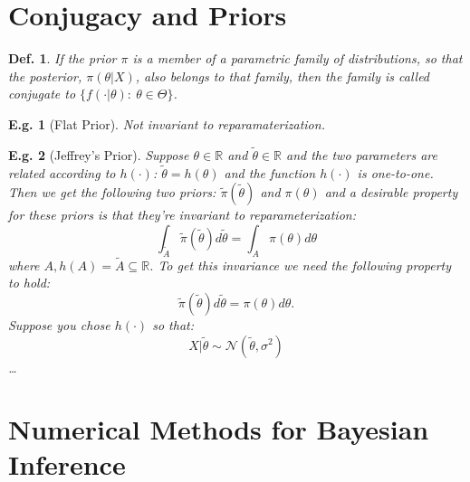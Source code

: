 \documentclass{tufte-book}
\theoremstyle{mytheoremstyle}
\theoremstyle{mylemstyle}
\theoremstyle{mydefstyle}
\newtheorem*{mydef}{Def.}
\newtheorem*{ex}{E.g.}
\begin{document}
\section{Conjugacy and Priors}
\begin{mydef} If the prior \(\pi\) is a member of a parametric family of distributions, so that the posterior, \(\pi(\theta|X)\), also belongs to that family, then the family is called conjugate to \(\{f(\cdot | \theta):\ \theta \in \Theta\}\). 
\end{mydef}

\begin{ex}[Flat Prior] Not invariant to reparamaterization. 
\end{ex}


\begin{ex}[Jeffrey's Prior] Suppose \(\theta \in \mathbb{R}\) and \(\tilde{\theta} \in \mathbb{R}\) and the two parameters are related according to \(h(\cdot)\): \(\tilde{\theta} = h(\theta)\) and the function \(h(\cdot)\) is one-to-one. Then we get the following two priors: \(\tilde{\pi}(\tilde{\theta})\) and \(\pi(\theta)\) and a desirable property for these priors is that they're invariant to reparameterization:
	\[\int_{\tilde{A}} \tilde{\pi}(\tilde{\theta})d\tilde{\theta} = \int_A \pi(\theta)d\theta\]
where \(A, h(A)=\tilde{A} \subseteq \mathbb{R}\). To get this invariance we need the following property to hold:
	\[\tilde{\pi}(\tilde{\theta})d\tilde{\theta} = \pi(\theta)d\theta \text{.}\]
Suppose you chose \(h(\cdot)\) so that:
	\[X | \tilde{\theta} \sim \mathcal{N}(\tilde{\theta}, \sigma^2)\]
	\dots
\end{ex}


\section{Numerical Methods for Bayesian Inference}
\end{document}
